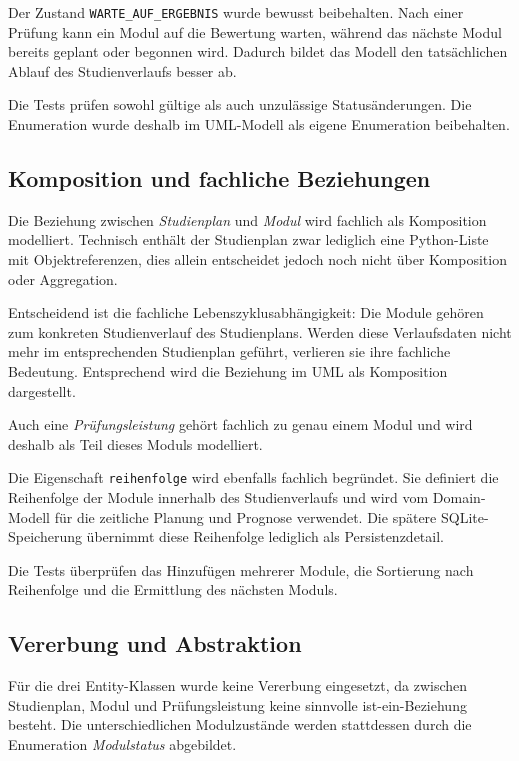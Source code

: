 \documentclass[11pt,a4paper]{article}
\begin{document}
Der Zustand \texttt{WARTE\_AUF\_ERGEBNIS} wurde bewusst beibehalten.
Nach einer Prüfung kann ein Modul auf die Bewertung warten, während
das nächste Modul bereits geplant oder begonnen wird. Dadurch bildet
das Modell den tatsächlichen Ablauf des Studienverlaufs besser ab.

Die Tests prüfen sowohl gültige als auch unzulässige
Statusänderungen. Die Enumeration wurde deshalb im UML-Modell als
eigene Enumeration beibehalten.

\subsection{Komposition und fachliche Beziehungen}

Die Beziehung zwischen \textit{Studienplan} und \textit{Modul} wird
fachlich als Komposition modelliert. Technisch enthält der
Studienplan zwar lediglich eine Python-Liste mit Objektreferenzen,
dies allein entscheidet jedoch noch nicht über Komposition oder
Aggregation.

Entscheidend ist die fachliche Lebenszyklusabhängigkeit: Die Module
gehören zum konkreten Studienverlauf des Studienplans. Werden diese
Verlaufsdaten nicht mehr im entsprechenden Studienplan geführt,
verlieren sie ihre fachliche Bedeutung. Entsprechend wird die
Beziehung im UML als Komposition dargestellt.

Auch eine \textit{Prüfungsleistung} gehört fachlich zu genau einem
Modul und wird deshalb als Teil dieses Moduls modelliert.

Die Eigenschaft \texttt{reihenfolge} wird ebenfalls fachlich
begründet. Sie definiert die Reihenfolge der Module innerhalb des
Studienverlaufs und wird vom Domain-Modell für die zeitliche Planung
und Prognose verwendet. Die spätere SQLite-Speicherung übernimmt
diese Reihenfolge lediglich als Persistenzdetail.

Die Tests überprüfen das Hinzufügen mehrerer Module, die Sortierung
nach Reihenfolge und die Ermittlung des nächsten Moduls.

\subsection{Vererbung und Abstraktion}

Für die drei Entity-Klassen wurde keine Vererbung eingesetzt, da
zwischen Studienplan, Modul und Prüfungsleistung keine sinnvolle
\glqq ist-ein\grqq-Beziehung besteht. Die unterschiedlichen
Modulzustände werden stattdessen durch die Enumeration
\textit{Modulstatus} abgebildet.
\end{document}
